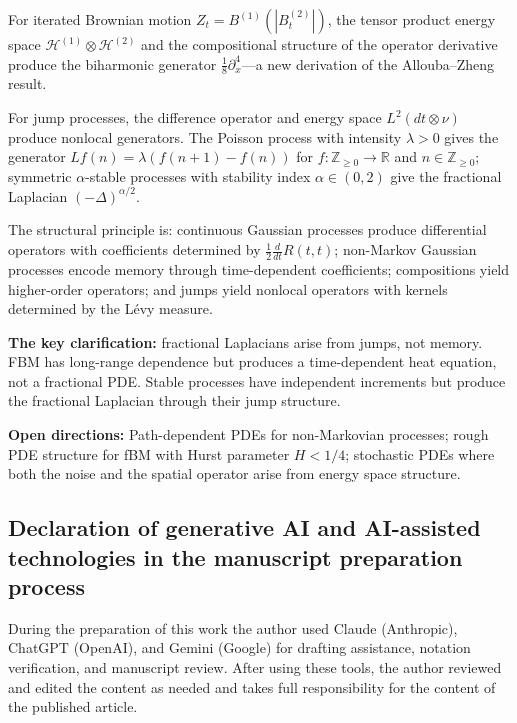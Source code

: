 \documentclass[12pt]{article}
\theoremstyle{plain}
\theoremstyle{definition}
\theoremstyle{remark}
\newcommand{\R}{\mathbb{R}}
\newcommand{\Z}{\mathbb{Z}}
\newcommand{\HH}{\mathcal{H}}
\begin{document}
For iterated Brownian motion $Z_t = B^{(1)}(|B_t^{(2)}|)$, the tensor product energy space $\HH^{(1)} \otimes \HH^{(2)}$ and the compositional structure of the operator derivative produce the biharmonic generator $\frac{1}{8}\partial_x^4$---a new derivation of the Allouba--Zheng result.

For jump processes, the difference operator and energy space $L^2(dt \otimes \nu)$ produce nonlocal generators. The Poisson process with intensity $\lambda > 0$ gives the generator $Lf(n) = \lambda(f(n+1) - f(n))$ for $f: \Z_{\geq 0} \to \R$ and $n \in \Z_{\geq 0}$; symmetric $\alpha$-stable processes with stability index $\alpha \in (0,2)$ give the fractional Laplacian $(-\Delta)^{\alpha/2}$.

The structural principle is: continuous Gaussian processes produce differential operators with coefficients determined by $\frac{1}{2}\frac{d}{dt}R(t,t)$; non-Markov Gaussian processes encode memory through time-dependent coefficients; compositions yield higher-order operators; and jumps yield nonlocal operators with kernels determined by the L\'{e}vy measure.

\textbf{The key clarification:} fractional Laplacians arise from jumps, not memory. FBM has long-range dependence but produces a time-dependent heat equation, not a fractional PDE. Stable processes have independent increments but produce the fractional Laplacian through their jump structure.

\textbf{Open directions:} Path-dependent PDEs for non-Markovian processes; rough PDE structure for fBM with Hurst parameter $H < 1/4$; stochastic PDEs where both the noise and the spatial operator arise from energy space structure.

\subsection*{Declaration of generative AI and AI-assisted technologies in the manuscript preparation process}

During the preparation of this work the author used Claude (Anthropic), ChatGPT (OpenAI), and Gemini (Google) for drafting assistance, notation verification, and manuscript review. After using these tools, the author reviewed and edited the content as needed and takes full responsibility for the content of the published article.

\end{document}
